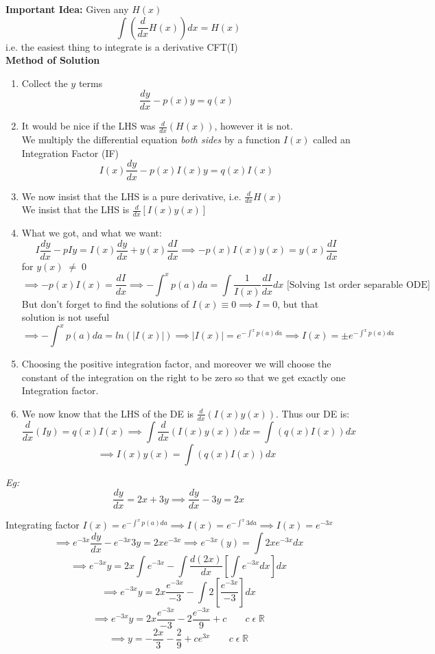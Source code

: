 \documentclass[11pt]{article}
\theoremstyle{definition}
\newcommand{\R}{\mathbb{R}}
\begin{document}
\textbf{Important Idea:} Given any $H(x)$
$$\int (\frac{d}{dx}H(x)) dx = H(x)$$
i.e. the easiest thing to integrate is a derivative CFT(I)\\

\textbf{Method of Solution}
\begin{enumerate}
    \item Collect the $y$ terms
    $$\frac{dy}{dx} - p(x)y = q(x)$$
    \item It would be nice if the LHS was $\frac{d}{dx}(H(x))$, however it is not.\\
    We multiply the differential equation \textit{both sides} by a function $I(x)$ called an Integration Factor (IF)
        $$I(x)\frac{dy}{dx} - p(x)I(x)y = q(x)I(x)$$
    \item We now insist that the LHS is a pure derivative, i.e. $\frac{d}{dx}H(x)$\\
    We insist that the LHS is $\frac{d}{dx}[I(x)y(x)]$
    \item What we got, and what we want:
    $$I\frac{dy}{dx} - pIy = I(x)\frac{dy}{dx} + y(x)\frac{dI}{dx} \implies -p(x)I(x)y(x) = y(x)\frac{dI}{dx}$$
    for $y(x)\; \neq\; 0$
    $$\implies -p(x)I(x) = \frac{dI}{dx} \implies -\int^x p(a) da = \int \frac{1}{I(x)} \frac{dI}{dx}dx \mbox{ [Solving 1st order separable ODE]}$$
    But don't forget to find the solutions of $I(x) \equiv 0 \implies I = 0$, but that solution is not useful
    $$\implies -\int^x p(a) da = ln(|I(x)|) \implies |I(x)| = e^{-\int^x p(a) da} \implies I(x) = \pm e^{-\int^x p(a) da}$$
    \item Choosing the positive integration factor, and moreover we will choose the constant of the integration on the right to be zero so that we get exactly one Integration factor.
    \item We now know that the LHS of the DE is $\frac{d}{dx}(I(x)y(x))$. Thus our DE is:
    $$\frac{d}{dx}(Iy) = q(x)I(x) \implies \int \frac{d}{dx}(I(x)y(x))dx = \int(q(x)I(x))dx$$ $$\implies I(x)y(x) = \int(q(x)I(x))dx$$
\end{enumerate}

\textit{Eg:} $$\frac{dy}{dx} = 2x + 3y \implies \frac{dy}{dx} - 3y = 2x$$

Integrating factor $I(x) = e^{-\int^x p(a)da} \implies I(x) = e^{-\int^x 3da} \implies I(x) = e^{-3x}$
$$\implies e^{-3x}\frac{dy}{dx} - e^{-3x}3y = 2xe^{-3x} \implies e^{-3x}(y) = \int2xe^{-3x}dx$$
$$\implies e^{-3x}y = 2x\int e^{-3x} - \int \frac{d(2x)}{dx}[\int e^{-3x} dx] dx$$
$$\implies e^{-3x}y = 2x\frac{e^{-3x}}{-3} - \int 2[\frac{e^{-3x}}{-3}] dx$$
$$\implies e^{-3x}y = 2x\frac{e^{-3x}}{-3} - 2\frac{e^{-3x}}{9} + c \;\;\;\;\;\;\; c\; \epsilon\; \R$$
$$\implies y = -\frac{2x}{3} - \frac{2}{9} + ce^{3x} \;\;\;\;\;\;\; c\; \epsilon\; \R$$
\end{document}
